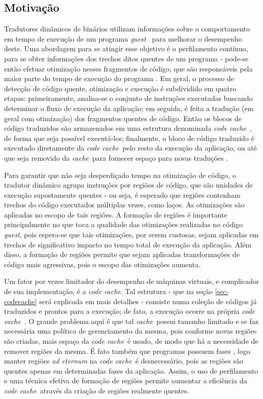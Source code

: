 \documentclass[11pt,twoside]{article}
\newcommand{\ccache}{\emph{code cache}}
\newcommand{\cache}{\emph{cache}}
\newcommand{\guest}{\emph{guest}}
\begin{document}
\subsection{Motivação}
Tradutores dinâmicos de binários utilizam informações sobre o comportamento em tempo de execução de um programa \guest~ para melhorar o desempenho deste. Uma abordagem para se atingir esse objetivo é o perfilamento contínuo, para se obter informações dos trechos ditos quentes de um programa - pode-se então efetuar otimização nesses fragmentos de código, que são responsáveis pela maior parte do tempo de execução do programa \cite{guido-2012}. Em geral, o processo de detecção de código quente, otimização e execução é subdividido em quatro etapas: primeiramente, analisa-se o conjunto de instruções executadas buscando determinar o fluxo de execução da aplicação; em seguida, é feita a tradução (em geral com otimização) dos fragmentos quentes de código. Então os blocos de código traduzidos são armazenados em uma estrutura denominada \ccache~, de forma que seja possível executá-los;  finalmente, o bloco de código traduzido é executado diretamente da \ccache~pelo resto da execução da aplicação, ou até que seja removido da \cache~para fornecer espaço para novas traduções \cite{kim-2004}.

Para garantir que não seja desperdiçado tempo na otimização de código, o tradutor dinâmico agrupa instruções por regiões de código, que são unidades de execução supostamente quentes - ou seja, é esperado que regiões contenham trechos do código executados múltiplas vezes, como laços. As otimizações são aplicadas no escopo de tais regiões. A formação de regiões é importante principalmente no que toca a qualidade das otimizações realizadas no código \guest, pois espera-se que tais otimizações, por serem custosas, sejam aplicadas em trechos de significativo impacto no tempo total de execução da aplicação. Além disso, a formação de regiões permite que sejam aplicadas transformações de código mais agressivas, pois o escopo das otimizações aumenta.

Um fator por vezes limitador do desempenho de máquinas virtuais, e complicador de sua implementação, é a \ccache. Tal estrutura - que na seção \ref{sec-codecache} será explicada em mais detalhes - consiste numa coleção de códigos já traduzidos e prontos para a execução; de fato, a execução ocorre na própria \ccache~. O grande problema aqui é que tal \cache~possui tamanho limitado e se faz necessária uma política de gerenciamento da mesma, pois conforme novas regiões são criadas, mais espaço da \ccache~é usado, de modo que há a necessidade de remover regiões da mesma. É fato também que programas possuem fases \cite{program-phases}, logo manter regiões \emph{ad eternum} na \ccache~é desnecessário, pois as regiões são quentes apenas em determinadas fases da aplicação. Assim, o uso de perfilamento e uma técnica efetiva de formação de regiões permite aumentar a eficiência da \ccache~através da criação de regiões realmente quentes.
\end{document}
